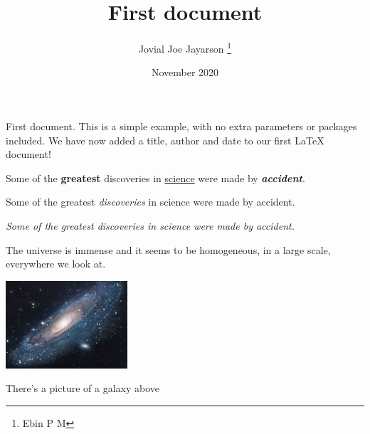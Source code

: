 \documentclass[12pt, a4paper]{article}
\title{First document}
\author{Jovial Joe Jayarson \thanks{Ebin P M}}
\date{November 2020}
\begin{document}
\maketitle %

First document. This is a simple example, with no extra parameters or packages included. We have now added a title, author and date to our first \LaTeX{} document!


Some of the \textbf{greatest} discoveries in \underline{science} were made by \textbf{\textit{accident}}. %

Some of the greatest \emph{discoveries} in science were made by accident.

\textit{Some of the greatest \emph{discoveries} in science were made by accident.}


The universe is immense and it seems to be homogeneous, in a large scale, everywhere we look at.

\includegraphics{universe} %

There's a picture of a galaxy above
\end{document}
